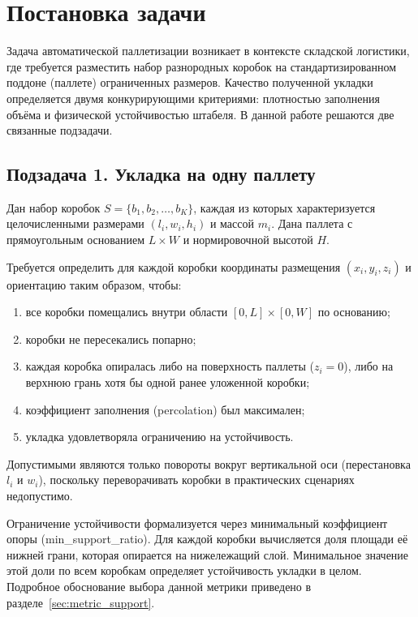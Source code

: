 \chapter{Постановка задачи}
\label{cha:Postanovka}

Задача автоматической паллетизации возникает в контексте складской логистики, где требуется разместить набор разнородных коробок на стандартизированном поддоне (паллете) ограниченных размеров. Качество полученной укладки определяется двумя конкурирующими критериями: плотностью заполнения объёма и физической устойчивостью штабеля. В данной работе решаются две связанные подзадачи.

\section{Подзадача 1. Укладка на одну паллету}

Дан набор коробок $S = \{b_1, b_2, \ldots, b_K\}$, каждая из которых характеризуется целочисленными размерами $(l_i, w_i, h_i)$ и массой $m_i$. Дана паллета с прямоугольным основанием $L \times W$ и нормировочной высотой $H$.

Требуется определить для каждой коробки координаты размещения $(x_i, y_i, z_i)$ и ориентацию таким образом, чтобы:
\begin{enumerate}
  \item все коробки помещались внутри области $[0, L] \times [0, W]$ по основанию;
  \item коробки не пересекались попарно;
  \item каждая коробка опиралась либо на поверхность паллеты ($z_i = 0$), либо на верхнюю грань хотя бы одной ранее уложенной коробки;
  \item коэффициент заполнения (percolation) был максимален;
  \item укладка удовлетворяла ограничению на устойчивость.
\end{enumerate}

Допустимыми являются только повороты вокруг вертикальной оси (перестановка $l_i$ и $w_i$), поскольку переворачивать коробки в практических сценариях недопустимо.

Ограничение устойчивости формализуется через минимальный коэффициент опоры (min\_support\_ratio). Для каждой коробки вычисляется доля площади её нижней грани, которая опирается на нижележащий слой. Минимальное значение этой доли по всем коробкам определяет устойчивость укладки в целом. Подробное обоснование выбора данной метрики приведено в разделе~\ref{sec:metric_support}.

